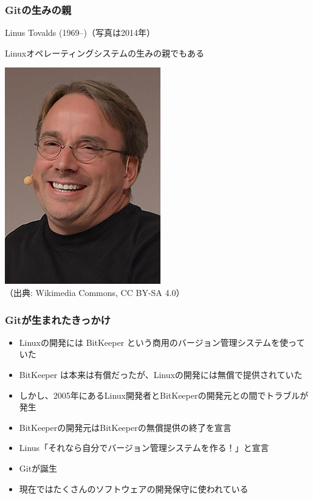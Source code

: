 \documentclass[dvipdfmx]{beamer}
\begin{document}
\begin{frame}
    \frametitle{Gitの生みの親}
    \large
    Linus Tovalds (1969--)（写真は2014年）

    Linuxオペレーティングシステムの生みの親でもある

    \begin{center}
        \includegraphics[scale=0.4]{256px-LinuxCon_Europe_Linus_Torvalds_03_(cropped).jpg}
        \\
        \small
        （出典: Wikimedia Commons, CC BY-SA 4.0）
    \end{center}
\end{frame}

\begin{frame}
    \frametitle{Gitが生まれたきっかけ \cite{git}}
    \large
    \begin{itemize}
        \item<1-> Linuxの開発には BitKeeper という商用のバージョン管理システムを使っていた
        \item<2-> BitKeeper は本来は有償だったが、Linuxの開発には無償で提供されていた
        \item<3-> しかし、2005年にあるLinux開発者とBitKeeperの開発元との間でトラブルが発生
        \item<4-> BitKeeperの開発元はBitKeeperの無償提供の終了を宣言
        \item<5-> Linus「それなら自分でバージョン管理システムを作る！」と宣言
        \item<6-> Gitが誕生 \cite{git-linux}
        \item<7-> 現在ではたくさんのソフトウェアの開発保守に使われている
    \end{itemize}
\end{frame}
\end{document}

